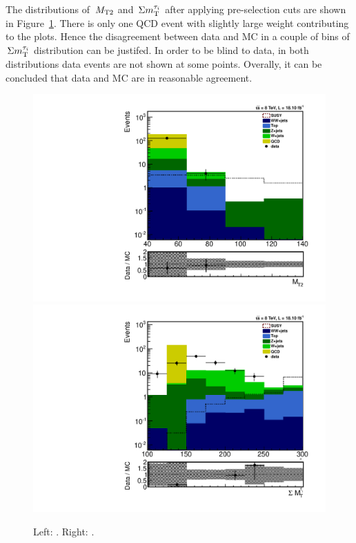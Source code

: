 The distributions of $\,{M_{\rm T2}}$ and $\,\Sigma m_{\rm T}^{\tau_i}$ after applying pre-selection cuts are shown in Figure~\ref{fig:comparison}. There is only one QCD event with slightly large weight contributing to the plots. Hence the disagreement between data and MC in a couple of bins of $\,\Sigma m_{\rm T}^{\tau_i}$ distribution can be justifed. In order to be blind to data, in both distributions data events are not shown at some points. Overally, it can be concluded that data and MC are in reasonable agreement. 
\begin{figure}[htbp]
\centering
\includegraphics[angle=0,scale=0.35]{TauTauFigs/MT2_4bins.pdf}
\includegraphics[angle=0,scale=0.35]{TauTauFigs/SumMT_8bins.pdf} \\
\caption{Left: \mttwo. Right: \SumMT.}
\label{fig:comparison}
\end{figure}

